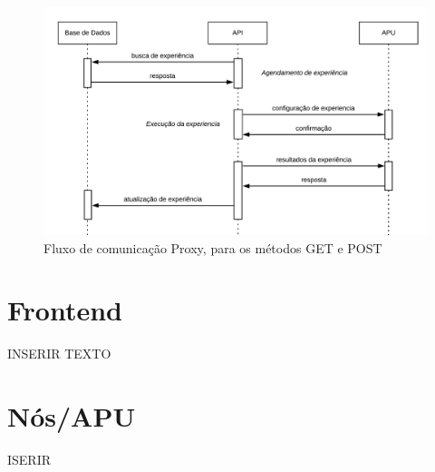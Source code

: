 \begin{figure}[!ht]
    \centering
    \includegraphics[width=\textwidth]{images/fluxo4.png}
    \caption{Fluxo de comunicação Proxy, para os métodos GET e POST}
    \label{fig:agendamento}
\end{figure}
\section{Frontend}
INSERIR TEXTO

\section{Nós/APU}
ISERIR


\newpage
\hfill\break
